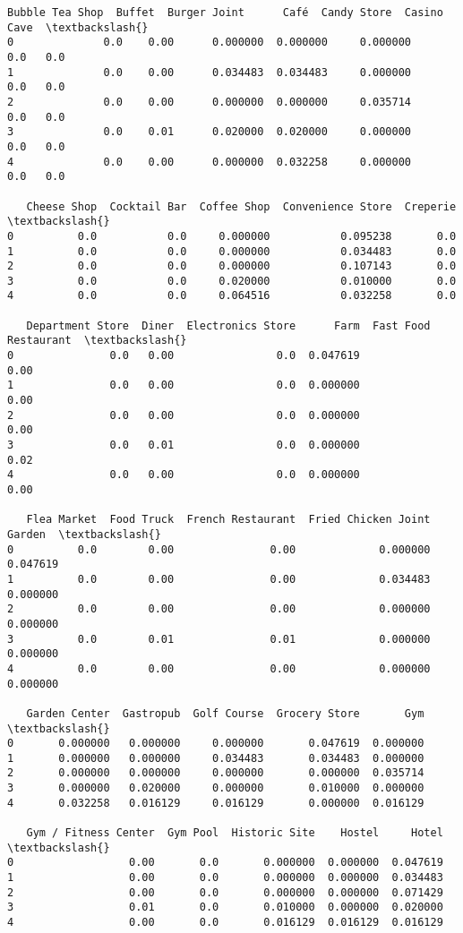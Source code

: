 \documentclass[11pt]{article}
\begin{document}
\begin{tcolorbox}[breakable, size=fbox, boxrule=.5pt, pad at break*=1mm, opacityfill=0]
\begin{Verbatim}[commandchars=\\\{\}]
   Bubble Tea Shop  Buffet  Burger Joint      Café  Candy Store  Casino  Cave  \textbackslash{}
0              0.0    0.00      0.000000  0.000000     0.000000     0.0   0.0
1              0.0    0.00      0.034483  0.034483     0.000000     0.0   0.0
2              0.0    0.00      0.000000  0.000000     0.035714     0.0   0.0
3              0.0    0.01      0.020000  0.020000     0.000000     0.0   0.0
4              0.0    0.00      0.000000  0.032258     0.000000     0.0   0.0

   Cheese Shop  Cocktail Bar  Coffee Shop  Convenience Store  Creperie  \textbackslash{}
0          0.0           0.0     0.000000           0.095238       0.0
1          0.0           0.0     0.000000           0.034483       0.0
2          0.0           0.0     0.000000           0.107143       0.0
3          0.0           0.0     0.020000           0.010000       0.0
4          0.0           0.0     0.064516           0.032258       0.0

   Department Store  Diner  Electronics Store      Farm  Fast Food Restaurant  \textbackslash{}
0               0.0   0.00                0.0  0.047619                  0.00
1               0.0   0.00                0.0  0.000000                  0.00
2               0.0   0.00                0.0  0.000000                  0.00
3               0.0   0.01                0.0  0.000000                  0.02
4               0.0   0.00                0.0  0.000000                  0.00

   Flea Market  Food Truck  French Restaurant  Fried Chicken Joint    Garden  \textbackslash{}
0          0.0        0.00               0.00             0.000000  0.047619
1          0.0        0.00               0.00             0.034483  0.000000
2          0.0        0.00               0.00             0.000000  0.000000
3          0.0        0.01               0.01             0.000000  0.000000
4          0.0        0.00               0.00             0.000000  0.000000

   Garden Center  Gastropub  Golf Course  Grocery Store       Gym  \textbackslash{}
0       0.000000   0.000000     0.000000       0.047619  0.000000
1       0.000000   0.000000     0.034483       0.034483  0.000000
2       0.000000   0.000000     0.000000       0.000000  0.035714
3       0.000000   0.020000     0.000000       0.010000  0.000000
4       0.032258   0.016129     0.016129       0.000000  0.016129

   Gym / Fitness Center  Gym Pool  Historic Site    Hostel     Hotel  \textbackslash{}
0                  0.00       0.0       0.000000  0.000000  0.047619
1                  0.00       0.0       0.000000  0.000000  0.034483
2                  0.00       0.0       0.000000  0.000000  0.071429
3                  0.01       0.0       0.010000  0.000000  0.020000
4                  0.00       0.0       0.016129  0.016129  0.016129


\end{Verbatim}
\end{tcolorbox}
\end{document}
